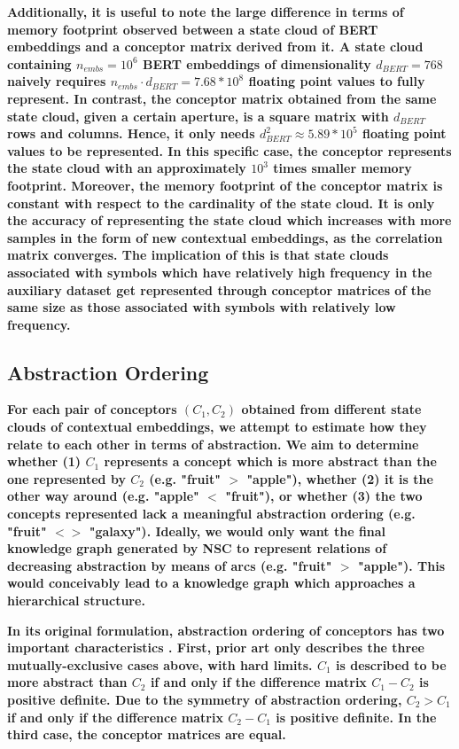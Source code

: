 \textbf{Additionally, it is useful to note the large difference in terms of memory footprint observed between a state cloud of BERT embeddings and a conceptor matrix derived from it. A state cloud containing $n_{embs} = 10^6$ BERT embeddings of dimensionality $d_{BERT}=768$ naively requires $n_{embs} \cdot d_{BERT} = 7.68 * 10^8$ floating point values to fully represent. In contrast, the conceptor matrix obtained from the same state cloud, given a certain aperture, is a square matrix with $d_{BERT}$ rows and columns. Hence, it only needs $d_{BERT}^2 \approx 5.89 * 10^5$ floating point values to be represented. In this specific case, the conceptor represents the state cloud with an approximately $10^3$ times smaller memory footprint. Moreover, the memory footprint of the conceptor matrix is constant with respect to the cardinality of the state cloud. It is only the accuracy of representing the state cloud which increases with more samples in the form of new contextual embeddings, as the correlation matrix converges. The implication of this is that state clouds associated with symbols which have relatively high frequency in the auxiliary dataset get represented through conceptor matrices of the same size as those associated with symbols with relatively low frequency.}

\subsection{Abstraction Ordering}

\textbf{For each pair of conceptors $(C_1, C_2)$ obtained from different state clouds of contextual embeddings, we attempt to estimate how they relate to each other in terms of abstraction. We aim to determine whether (1) $C_1$ represents a concept which is more abstract than the one represented by $C_2$ (e.g. "fruit" $>$ "apple"), whether (2) it is the other way around (e.g. "apple" $<$ "fruit"), or whether (3) the two concepts represented lack a meaningful abstraction ordering (e.g. "fruit" $<>$ "galaxy"). Ideally, we would only want the final knowledge graph generated by NSC to represent relations of decreasing abstraction by means of arcs (e.g. "fruit" $>$ "apple"). This would conceivably lead to a knowledge graph which approaches a hierarchical structure.}

\textbf{In its original formulation, abstraction ordering of conceptors has two important characteristics \citep{jaeger_controlling_2017}. First, prior art only describes the three mutually-exclusive cases above, with hard limits. $C_1$ is described to be more abstract than $C_2$ if and only if the difference matrix $C_1 - C_2$ is positive definite. Due to the symmetry of abstraction ordering, $C_2 > C_1$ if and only if the difference matrix $C_2 - C_1$ is positive definite. In the third case, the conceptor matrices are equal.}

